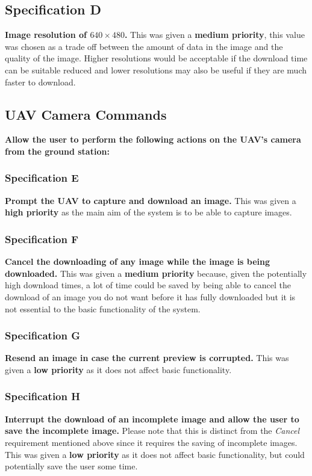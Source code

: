 	\subsection{Specification D}\label{sec:spec_d} \textbf{Image resolution of \textbf{$640\times480$}.} 
This was given a \textbf{medium priority}, this value was chosen as a trade off between the amount of data in the image and the quality of the image. Higher resolutions would be acceptable if the download time can be suitable reduced and lower resolutions may also be useful if they are much faster to download.
	\subsection{UAV Camera Commands} \textbf{Allow the user to perform the following actions on the UAV’s camera from the ground station:} 
		\subsubsection{Specification E}\label{sec:spec_e} \textbf{Prompt the UAV to \textbf{capture and download an image}.}  
This was given a \textbf{high priority} as the main aim of the system is to be able to capture images.
		\subsubsection{Specification F}\label{sec:spec_f} \textbf{\textbf{Cancel} the downloading of any image while the image is being downloaded.} 
This was given a \textbf{medium priority} because, given the potentially high download times, a lot of time could be saved by being able to cancel the download of an image you do not want before it has fully downloaded but it is not essential to the basic functionality of the system.
		\subsubsection{Specification G}\label{sec:spec_g} \textbf{\textbf{Resend} an image in case the current preview is corrupted.}  
This was given a \textbf{low priority} as it does not affect basic functionality.
		\subsubsection{Specification H}\label{sec:spec_h} \textbf{\textbf{Interrupt} the download of an incomplete image and allow the user to save the incomplete image.}  
Please note that this is distinct from the \emph{Cancel} requirement mentioned above since it requires the saving of incomplete images. This was given a \textbf{low priority} as it does not affect basic functionality, but could potentially save the user some time.
